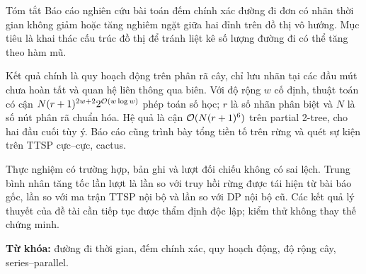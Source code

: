 \begin{preamble}{Tóm tắt}
Báo cáo nghiên cứu bài toán đếm chính xác đường đi đơn có nhãn thời gian không giảm hoặc tăng nghiêm ngặt giữa hai đỉnh trên đồ thị vô hướng. Mục tiêu là khai thác cấu trúc đồ thị để tránh liệt kê số lượng đường đi có thể tăng theo hàm mũ.

Kết quả chính là quy hoạch động trên phân rã cây, chỉ lưu nhãn tại các đầu mút chưa hoàn tất và quan hệ liên thông qua biên. Với độ rộng $w$ cố định, thuật toán có cận $N(r+1)^{2w+2}2^{\mathcal{O}(w\log w)}$ phép toán số học; $r$ là số nhãn phân biệt và $N$ là số nút phân rã chuẩn hóa. Hệ quả là cận $\mathcal{O}(N(r+1)^6)$ trên partial 2-tree, cho hai đầu cuối tùy ý. Báo cáo cũng trình bày tổng tiền tố trên rừng và quét sự kiện trên TTSP cực--cực, cactus.

Thực nghiệm có \BenchmarkCases{} trường hợp, \RawRows{} bản ghi và \AuditComparisons{} lượt đối chiếu không có sai lệch. Trung bình nhân tăng tốc lần lượt là \ForestGM{} lần so với truy hồi rừng được tái hiện từ bài báo gốc, \TTSPGM{} lần so với ma trận TTSP nội bộ và \PartialGM{} lần so với DP nội bộ cũ. Các kết quả lý thuyết của đề tài cần tiếp tục được thẩm định độc lập; kiểm thử không thay thế chứng minh.

\vspace{0.4cm}\textbf{Từ khóa:} đường đi thời gian, đếm chính xác, quy hoạch động, độ rộng cây, series--parallel.
\end{preamble}
